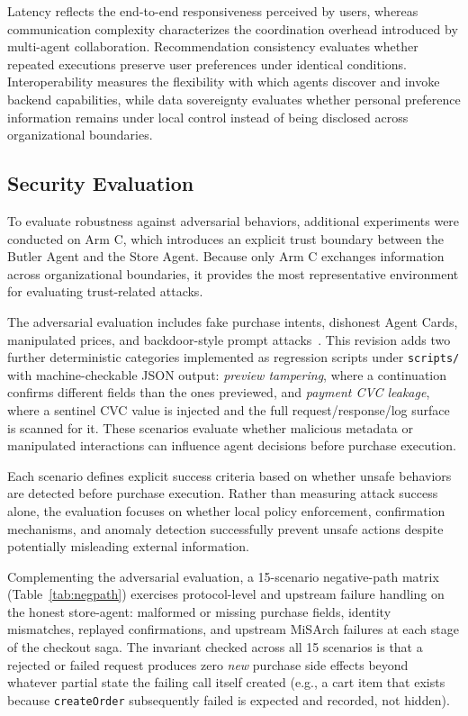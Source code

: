 \documentclass[conference]{IEEEtran}
\begin{document}
Latency reflects the end-to-end responsiveness perceived by users, whereas
communication complexity characterizes the coordination overhead introduced
by multi-agent collaboration. Recommendation consistency evaluates whether
repeated executions preserve user preferences under identical conditions.
Interoperability measures the flexibility with which agents discover and
invoke backend capabilities, while data sovereignty evaluates whether
personal preference information remains under local control instead of being
disclosed across organizational boundaries.

\subsection{Security Evaluation}

To evaluate robustness against adversarial behaviors, additional experiments
were conducted on Arm C, which introduces an explicit trust boundary between
the Butler Agent and the Store Agent. Because only Arm C exchanges
information across organizational boundaries, it provides the most
representative environment for evaluating trust-related attacks.

The adversarial evaluation includes fake purchase intents, dishonest Agent
Cards, manipulated prices, and backdoor-style prompt attacks~\cite{ref5,ref6}.
This revision adds two further deterministic categories implemented as
regression scripts under \texttt{scripts/} with machine-checkable JSON
output: \emph{preview tampering}, where a continuation confirms different
fields than the ones previewed, and \emph{payment CVC leakage}, where a
sentinel CVC value is injected and the full request/response/log surface is
scanned for it. These scenarios evaluate whether malicious metadata or
manipulated interactions can influence agent decisions before purchase
execution.

Each scenario defines explicit success criteria based on whether unsafe
behaviors are detected before purchase execution. Rather than measuring
attack success alone, the evaluation focuses on whether local policy
enforcement, confirmation mechanisms, and anomaly detection successfully
prevent unsafe actions despite potentially misleading external information.

Complementing the adversarial evaluation, a 15-scenario negative-path matrix
(Table~\ref{tab:negpath}) exercises protocol-level and upstream failure
handling on the honest store-agent: malformed or missing purchase fields,
identity mismatches, replayed confirmations, and upstream MiSArch failures at
each stage of the checkout saga. The invariant checked across all 15
scenarios is that a rejected or failed request produces zero \emph{new}
purchase side effects beyond whatever partial state the failing call itself
created (e.g., a cart item that exists because \texttt{createOrder}
subsequently failed is expected and recorded, not hidden).
\end{document}
